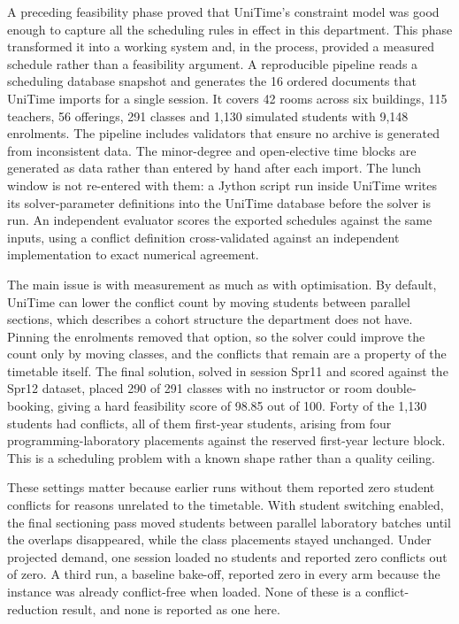 \documentclass[journal]{IEEEtran}
\begin{document}
A preceding feasibility phase proved that UniTime's constraint model was good enough to capture all the scheduling rules in effect in this department. This phase transformed it into a working system and, in the process, provided a measured schedule rather than a feasibility argument. A reproducible pipeline reads a scheduling database snapshot and generates the 16 ordered documents that UniTime imports for a single session. It covers 42 rooms across six buildings, 115 teachers, 56 offerings, 291 classes and 1{,}130 simulated students with 9{,}148 enrolments. The pipeline includes validators that ensure no archive is generated from inconsistent data. The minor-degree and open-elective time blocks are generated as data rather than entered by hand after each import. The lunch window is not re-entered with them: a Jython script run inside UniTime writes its solver-parameter definitions into the UniTime database before the solver is run. An independent evaluator scores the exported schedules against the same inputs, using a conflict definition cross-validated against an independent implementation to exact numerical agreement.

The main issue is with measurement as much as with optimisation. By default, UniTime can lower the conflict count by moving students between parallel sections, which describes a cohort structure the department does not have. Pinning the enrolments removed that option, so the solver could improve the count only by moving classes, and the conflicts that remain are a property of the timetable itself. The final solution, solved in session Spr11 and scored against the Spr12 dataset, placed 290 of 291 classes with no instructor or room double-booking, giving a hard feasibility score of 98.85 out of 100. Forty of the 1{,}130 students had conflicts, all of them first-year students, arising from four programming-laboratory placements against the reserved first-year lecture block. This is a scheduling problem with a known shape rather than a quality ceiling.

These settings matter because earlier runs without them reported zero student conflicts for reasons unrelated to the timetable. With student switching enabled, the final sectioning pass moved students between parallel laboratory batches until the overlaps disappeared, while the class placements stayed unchanged. Under projected demand, one session loaded no students and reported zero conflicts out of zero. A third run, a baseline bake-off, reported zero in every arm because the instance was already conflict-free when loaded. None of these is a conflict-reduction result, and none is reported as one here.
\end{document}
